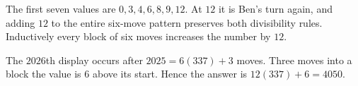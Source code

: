 The first seven values are $0,3,4,6,8,9,12$. At $12$ it is Ben's turn again, and adding $12$ to the entire six-move pattern preserves both divisibility rules. Inductively every block of six moves increases the number by $12$.

The $2026$th display occurs after $2025=6(337)+3$ moves. Three moves into a block the value is $6$ above its start. Hence the answer is $\boxed{12(337)+6=4050}$.
